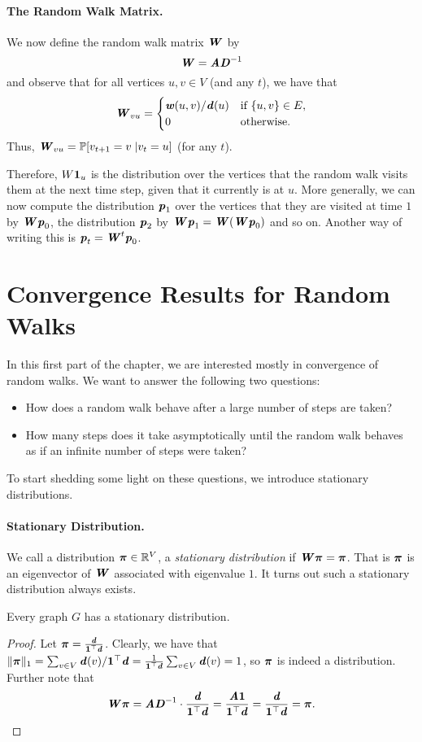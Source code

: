 \paragraph{The Random Walk Matrix.} We now define the random walk matrix $\boldsymbol{\mathit{W}}$ by
\[
    \boldsymbol{\mathit{W}} = \boldsymbol{\mathit{A}} \boldsymbol{\mathit{D}}^{-1}
\]
and observe that for all vertices $u,v \in V$ (and any $t$), we have that 
\[
\boldsymbol{\mathit{W}}_{vu} = \begin{cases}
    \boldsymbol{\mathit{w}}(u,v)/\boldsymbol{\mathit{d}}(u) & \text{if } \{u,v\} \in E,\\
    0 & \text{otherwise}.
\end{cases}
\]
Thus, $\boldsymbol{\mathit{W}}_{vu} = \mathbb{P}[v_{t+1} = v \; | v_t = u]$ (for any $t$). 

Therefore, $W \boldsymbol{1}_u$ is the distribution over the vertices that the random walk visits them at the next time step, given that it currently is at $u$. More generally, we can now compute the distribution $\boldsymbol{\mathit{p}}_1$ over the vertices that they are visited at time $1$ by $\boldsymbol{\mathit{W}} \boldsymbol{\mathit{p}}_0$, the distribution $\boldsymbol{\mathit{p}}_2$ by $\boldsymbol{\mathit{W}} \boldsymbol{\mathit{p}}_1 = \boldsymbol{\mathit{W}} ( \boldsymbol{\mathit{W}} \boldsymbol{\mathit{p}}_0)$ and so on. Another way of writing this is $\boldsymbol{\mathit{p}}_t = \boldsymbol{\mathit{W}}^t \boldsymbol{\mathit{p}}_{0}$.

\section{Convergence Results for Random Walks}

In this first part of the chapter, we are interested mostly in convergence of random walks. We want to answer the following two questions:
\begin{itemize}
	\item How does a random walk behave after a large number of steps are taken? 
	\item How many steps does it take asymptotically until the random walk behaves as if an infinite number of steps were taken?
\end{itemize}

To start shedding some light on these questions, we introduce stationary distributions.

\paragraph{Stationary Distribution.} We call a distribution $\boldsymbol{\pi} \in \mathbb{R}^V$, a \emph{stationary distribution} if $\boldsymbol{\mathit{W}}\boldsymbol{\pi} = \boldsymbol{\pi}$. That is $\boldsymbol{\pi}$ is an eigenvector of $\boldsymbol{\mathit{W}}$ associated with eigenvalue $1$. It turns out such a stationary distribution always exists.

\begin{lemma}\label{lma:thereExistsStationaryDistr}
Every graph $G$ has a stationary distribution.
\end{lemma}
\begin{proof}
Let $\boldsymbol{\pi} = \frac{\boldsymbol{\mathit{d}}}{\boldsymbol{1}^\top\boldsymbol{\mathit{d}}}$. Clearly, we have that $\|\boldsymbol{\pi}\|_1 = \sum_{v \in V} \boldsymbol{\mathit{d}}(v)/\boldsymbol{1}^\top\boldsymbol{\mathit{d}} = \frac{1}{\boldsymbol{1}^\top\boldsymbol{\mathit{d}}} \sum_{v \in V} \boldsymbol{\mathit{d}}(v) = 1$, so $\boldsymbol{\pi}$ is indeed a distribution. Further note that
\[
\boldsymbol{\mathit{W}} \boldsymbol{\pi} = \boldsymbol{\mathit{A}} \boldsymbol{\mathit{D}}^{-1} \cdot  \frac{\boldsymbol{\mathit{d}}}{\boldsymbol{1}^\top\boldsymbol{\mathit{d}}} = \frac{\boldsymbol{\mathit{A}} \boldsymbol{1}}{\boldsymbol{1}^\top \boldsymbol{\mathit{d}}} = \frac{\boldsymbol{\mathit{d}}}{\boldsymbol{1}^\top \boldsymbol{\mathit{d}}} = \boldsymbol{\pi}.
\]
\end{proof}

